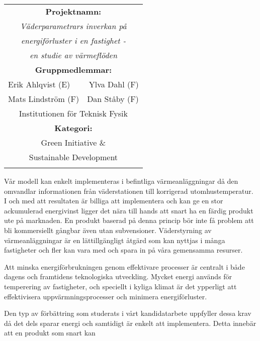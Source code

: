 \documentclass[11pt,a4paper]{article}
\begin{document}
\begin{multicols}{2}
\renewcommand{\arraystretch}{1.2}
\noindent
\resizebox{8cm}{!} {
\begin{tabular}{l r}
\hline
\multicolumn{2}{|c|}{\cellcolor{YellowGreen} \textbf{Projektnamn:}}\\[3pt]
\multicolumn{2}{|c|}{\cellcolor{YellowGreen} \textit{Väderparametrars inverkan på}}\\
\multicolumn{2}{|c|}{\cellcolor{YellowGreen} \textit{energiförluster i en fastighet -}}\\
\multicolumn{2}{|c|}{\cellcolor{YellowGreen} \textit{en studie av värmeflöden}}\\
\multicolumn{2}{|c|}{\cellcolor{YellowGreen} \textbf{Gruppmedlemmar:}} \\[3pt]
\multicolumn{1}{|l}{\cellcolor{YellowGreen} Erik Ahlqvist (E)} & \multicolumn{1}{r|}{\cellcolor{YellowGreen} Ylva Dahl (F)}\\
\multicolumn{1}{|l}{\cellcolor{YellowGreen} Mats Lindström (F)} & \multicolumn{1}{r|}{\cellcolor{YellowGreen} Dan Ståby (F)}\\
\multicolumn{2}{|c|}{\cellcolor{YellowGreen} Institutionen för Teknisk Fysik} \\
\multicolumn{2}{|c|}{\cellcolor{YellowGreen} \textbf{Kategori:}} \\[3pt]
\multicolumn{2}{|c|}{\cellcolor{YellowGreen} Green Initiative \&}\\
\multicolumn{2}{|c|}{\cellcolor{YellowGreen} Sustainable Development}\\
\hline
& \\
\end{tabular}
}


Vår modell kan enkelt implementeras i befintliga värmeanläggningar då den omvandlar informationen från väderstationen till korrigerad utomhustemperatur.
I och med att resultaten är billiga att implementera och kan ge en stor ackumulerad energivinst ligger det nära till hands att snart ha en färdig produkt ute på marknaden. En produkt baserad på denna princip bör inte få problem att bli kommersiellt gångbar även utan subvensioner. Väderstyrning av värmeanläggningar är en lättillgängligt åtgärd som kan nyttjas i många fastigheter och fler kan vara med och spara in på våra gemensamma resurser. 

Att minska energiförbrukningen genom effektivare processer är centralt i både dagens och framtidens teknologiska utveckling. Mycket energi
används för temperering av fastigheter, och speciellt i kyliga klimat
är det ypperligt att effektivisera uppvärmningsprocesser och
minimera energiförluster. 

Den typ av förbättring som studerats i vårt kandidatarbete uppfyller dessa krav då det dels sparar energi och samtidigt är enkelt att implementera. Detta innebär att en produkt som snart kan


\end{multicols}
\end{document}
